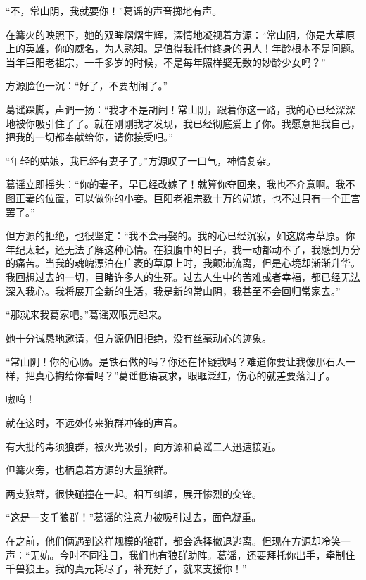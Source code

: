 
\begin{this_body}

“不，常山阴，我就要你！”葛谣的声音掷地有声。

在篝火的映照下，她的双眸熠熠生辉，深情地凝视着方源：“常山阴，你是大草原上的英雄，你的威名，为人熟知。是值得我托付终身的男人！年龄根本不是问题。当年巨阳老祖宗，一千多岁的时候，不是每年照样娶无数的妙龄少女吗？”

方源脸色一沉：“好了，不要胡闹了。”

葛谣跺脚，声调一扬：“我才不是胡闹！常山阴，跟着你这一路，我的心已经深深地被你吸引住了了。就在刚刚我才发现，我已经彻底爱上了你。我愿意把我自己，把我的一切都奉献给你，请你接受吧。”

“年轻的姑娘，我已经有妻子了。”方源叹了一口气，神情复杂。

葛谣立即摇头：“你的妻子，早已经改嫁了！就算你夺回来，我也不介意啊。我不图正妻的位置，可以做你的小妾。巨阳老祖宗数十万的妃嫔，也不过只有一个正宫罢了。”

但方源的拒绝，也很坚定：“我不会再娶的。我的心已经沉寂，如这腐毒草原。你年纪太轻，还无法了解这种心情。在狼腹中的日子，我一动都动不了，我感到万分的痛苦。当我的魂魄漂泊在广袤的草原上时，我颠沛流离，但是心境却渐渐升华。我回想过去的一切，目睹许多人的生死。过去人生中的苦难或者幸福，都已经无法深入我心。我将展开全新的生活，我是新的常山阴，我甚至不会回归常家去。”

“那就来我葛家吧。”葛谣双眼亮起来。

她十分诚恳地邀请，但方源仍旧拒绝，没有丝毫动心的迹象。

“常山阴！你的心肠。是铁石做的吗？你还在怀疑我吗？难道你要让我像那石人一样，把真心掏给你看吗？”葛谣低语哀求，眼眶泛红，伤心的就差要落泪了。

嗷呜！

就在这时，不远处传来狼群冲锋的声音。

有大批的毒须狼群，被火光吸引，向方源和葛谣二人迅速接近。

但篝火旁，也栖息着方源的大量狼群。

两支狼群，很快碰撞在一起。相互纠缠，展开惨烈的交锋。

“这是一支千狼群！”葛谣的注意力被吸引过去，面色凝重。

在之前，他们俩遇到这样规模的狼群，都会选择撤退逃离。但现在方源却冷笑一声：“无妨。今时不同往日，我们也有狼群助阵。葛谣，还要拜托你出手，牵制住千兽狼王。我的真元耗尽了，补充好了，就来支援你！”


\end{this_body}
